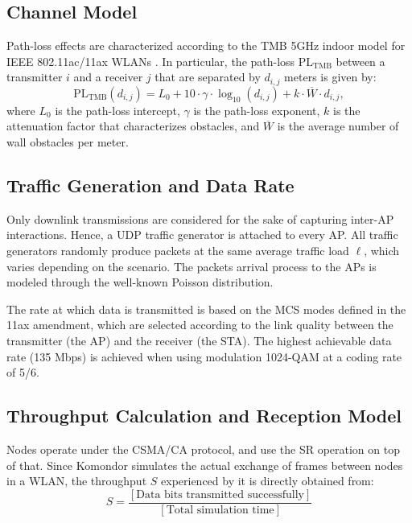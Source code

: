 \documentclass{article}
\begin{document}
	\subsection{Channel Model}
	Path-loss effects are characterized according to the TMB 5GHz indoor model for IEEE 802.11ac/11ax WLANs \cite{tmb}. In particular, the path-loss $\text{PL}_\text{TMB}$ between a transmitter $i$ and a receiver $j$ that are separated by $d_{i,j}$ meters is given by:%
	\begin{equation}
	\text{PL}_\text{TMB}(d_{i,j}) = L_0 + 10 \cdot \gamma \cdot \log_{10}(d_{i,j}) + k \cdot \overline{W} \cdot d_{i,j},
	\label{eq:tmb}
	\nonumber
	\end{equation} 
	where  $L_0$ is the path-loss
    intercept, $\gamma$ is the path-loss exponent, $k$ is the attenuation factor that characterizes obstacles, and $\overline{W}$ is the average number of wall obstacles per meter.
	
	\subsection{Traffic Generation and Data Rate}
	Only downlink transmissions are considered for the sake of capturing inter-AP interactions. Hence, a UDP traffic generator is attached to every AP. All traffic generators randomly produce packets at the same average traffic load $\ell$, which varies depending on the scenario. The packets arrival process to the APs is modeled through the well-known Poisson distribution.
	
	The rate at which data is transmitted is based on the MCS modes defined in the 11ax amendment, which are selected according to the link quality between the transmitter (the AP) and the receiver (the STA). The highest achievable data rate (135 Mbps) is achieved when using modulation 1024-QAM at a coding rate of 5/6.
	
	\subsection{Throughput Calculation and Reception Model}
	
	Nodes operate under the CSMA/CA protocol, and use the SR operation on top of that. Since Komondor simulates the actual exchange of frames between nodes in a WLAN, the throughput $S$ experienced by it is directly obtained from:
	\begin{equation}
	S = \frac{[\text{Data bits transmitted successfully}]}{[\text{Total simulation time}]}
	\nonumber
	\end{equation}
	
\end{document}
